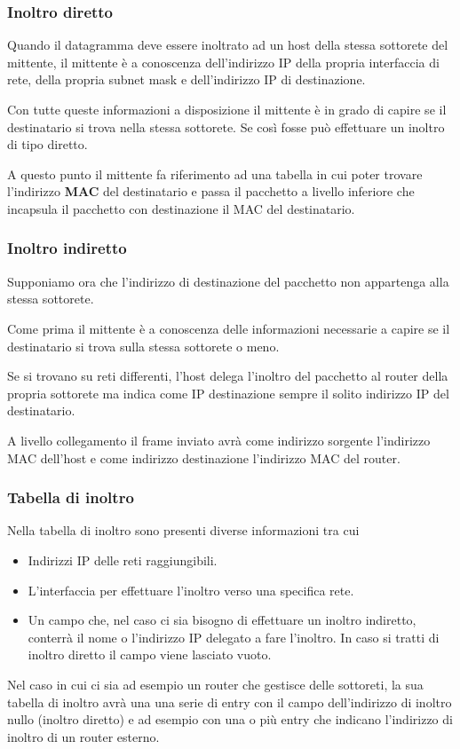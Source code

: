 \subsubsection{Inoltro diretto}
Quando il datagramma deve essere inoltrato ad un host della stessa 
sottorete del mittente, il mittente è a conoscenza dell'indirizzo IP
della propria interfaccia di rete, della propria subnet mask e 
dell'indirizzo IP di destinazione.

Con tutte queste informazioni a disposizione il mittente è in grado di
capire se il destinatario si trova nella stessa sottorete. Se così
fosse può effettuare un inoltro di tipo diretto.

A questo punto il mittente fa riferimento ad una tabella in cui poter
trovare l'indirizzo \textbf{MAC} del destinatario e passa il pacchetto
a livello inferiore che incapsula il pacchetto con destinazione il 
MAC del destinatario.

\subsubsection{Inoltro indiretto}
Supponiamo ora che l'indirizzo di destinazione del pacchetto non 
appartenga alla stessa sottorete.

Come prima il mittente è a conoscenza delle informazioni necessarie a
capire se il destinatario si trova sulla stessa sottorete o meno.

Se si trovano su reti differenti, l'host delega l'inoltro del pacchetto
al router della propria sottorete ma indica come IP destinazione sempre
il solito indirizzo IP del destinatario.

A livello collegamento il frame inviato avrà come indirizzo sorgente
l'indirizzo MAC dell'host e come indirizzo destinazione l'indirizzo MAC
del router.

\subsubsection{Tabella di inoltro}
Nella tabella di inoltro sono presenti diverse informazioni tra cui
\begin{itemize}
	\item Indirizzi IP delle reti raggiungibili.
	\item L'interfaccia per effettuare l'inoltro verso una specifica
		rete.
	\item Un campo che, nel caso ci sia bisogno di effettuare un 
		inoltro indiretto, conterrà il nome o l'indirizzo IP delegato
		a fare l'inoltro. In caso si tratti di inoltro diretto il campo
		viene lasciato vuoto.
\end{itemize}
Nel caso in cui ci sia ad esempio un router che gestisce delle 
sottoreti, la sua tabella di inoltro avrà una una serie di entry con
il campo dell'indirizzo di inoltro nullo (inoltro diretto) e ad esempio
con una o più entry che indicano l'indirizzo di inoltro di un router
esterno.

